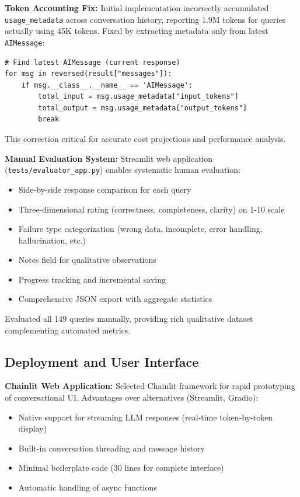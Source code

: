 \documentclass{article}
\begin{document}
\textbf{Token Accounting Fix:} Initial implementation incorrectly accumulated \texttt{usage\_metadata} across conversation history, reporting 1.9M tokens for queries actually using 45K tokens. Fixed by extracting metadata only from latest \texttt{AIMessage}:

\begin{verbatim}
# Find latest AIMessage (current response)
for msg in reversed(result["messages"]):
    if msg.__class__.__name__ == 'AIMessage':
        total_input = msg.usage_metadata["input_tokens"]
        total_output = msg.usage_metadata["output_tokens"]
        break
\end{verbatim}

This correction critical for accurate cost projections and performance analysis.

\textbf{Manual Evaluation System:} Streamlit web application (\texttt{tests/evaluator\_app.py}) enables systematic human evaluation:

\begin{itemize}
    \item Side-by-side response comparison for each query
    \item Three-dimensional rating (correctness, completeness, clarity) on 1-10 scale
    \item Failure type categorization (wrong data, incomplete, error handling, hallucination, etc.)
    \item Notes field for qualitative observations
    \item Progress tracking and incremental saving
    \item Comprehensive JSON export with aggregate statistics
\end{itemize}

Evaluated all 149 queries manually, providing rich qualitative dataset complementing automated metrics.

\subsection{Deployment and User Interface}

\textbf{Chainlit Web Application:} Selected Chainlit framework for rapid prototyping of conversational UI. Advantages over alternatives (Streamlit, Gradio):

\begin{itemize}
    \item Native support for streaming LLM responses (real-time token-by-token display)
    \item Built-in conversation threading and message history
    \item Minimal boilerplate code (30 lines for complete interface)
    \item Automatic handling of async functions
\end{itemize}
\end{document}
